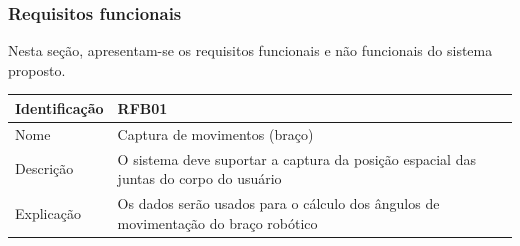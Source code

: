 	\subsubsection{Requisitos funcionais}\label{subsec-req-func}
	Nesta seção, apresentam-se os requisitos funcionais e não funcionais do sistema proposto.
\par
	\begin{center}
		\begin{tabular}{ | l |  p{7cm} |}
			\hline
			Identificação & RFB01  \\ \hline
			Nome & Captura de movimentos (braço)\\ \hline
			Descrição & O sistema deve suportar a captura da posição espacial das juntas do corpo do usuário
			\\ \hline
			Explicação & Os dados serão usados para o cálculo dos ângulos de movimentação do braço robótico  
			\\ \hline

		\end{tabular}
	\end{center}

